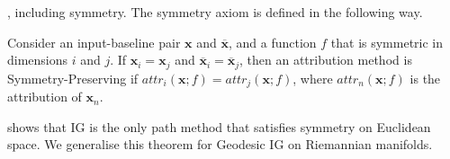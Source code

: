 , including symmetry. The symmetry axiom is defined in the following way. 
\begin{definition}
	Consider an input-baseline pair $\textbf{x}$ and $\overline{\textbf{x}}$, and a function $f$ that is symmetric in dimensions $i$ and $j$. If $\textbf{x}_i = \textbf{x}_j$ and $\overline{\textbf{x}}_i = \overline{\textbf{x}}_j$, then an attribution method is Symmetry-Preserving if $attr_i(\textbf{x}; f) = attr_j(\textbf{x}; f)$, where $attr_n(\textbf{x}; f)$ is the attribution of $\textbf{x}_n$.
\end{definition}
\citep[Theorem 1]{sundararajan2017axiomatic} shows that IG is the only path method that satisfies symmetry on Euclidean space. We generalise this theorem for Geodesic IG on Riemannian manifolds.